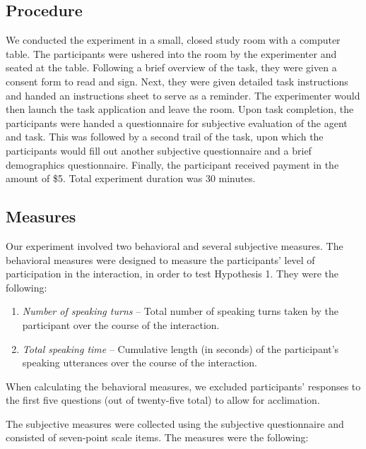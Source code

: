 \subsection{Procedure}

We conducted the experiment in a small, closed study room with a computer table. The participants were ushered into the room by the experimenter and seated at the table. Following a brief overview of the task, they were given a consent form to read and sign. Next, they were given detailed task instructions and handed an instructions sheet to serve as a reminder. The experimenter would then launch the task application and leave the room. Upon task completion, the participants were handed a questionnaire for subjective evaluation of the agent and task. This was followed by a second trail of the task, upon which the participants would fill out another subjective questionnaire and a brief demographics questionnaire. Finally, the participant received payment in the amount of \$5. Total experiment duration was 30 minutes.

\subsection{Measures}

Our experiment involved two behavioral and several subjective measures. The behavioral measures were designed to measure the participants' level of participation in the interaction, in order to test Hypothesis 1. They were the following:

\begin{enumerate}
\item \emph{Number of speaking turns} -- Total number of speaking turns taken by the participant over the course of the interaction.
\item \emph{Total speaking time} -- Cumulative length (in seconds) of the participant's speaking utterances over the course of the interaction.
\end{enumerate}

When calculating the behavioral measures, we excluded participants' responses to the first five questions (out of twenty-five total) to allow for acclimation.

The subjective measures were collected using the subjective questionnaire and consisted of seven-point scale items. The measures were the following:

